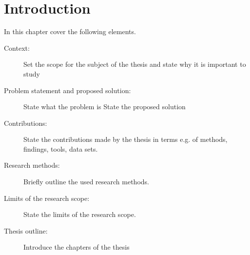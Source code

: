 \chapter{Introduction}
\label{ch:intro}

In this chapter cover the following elements.
\begin{description}
\item[Context:]
Set the scope for the subject of the thesis
and state why it is important to study

\item[Problem statement and proposed solution:]
State what the problem is State the proposed solution

\item[Contributions:]
State the contributions made by the thesis in terms e.g. of
methods, findings, tools, data sets.

\item[Research methods:]
Briefly outline the used research methods.

\item[Limits of the research scope:]
State the limits of the research scope.

\item[Thesis outline:]
Introduce the chapters of the thesis
\end{description}
